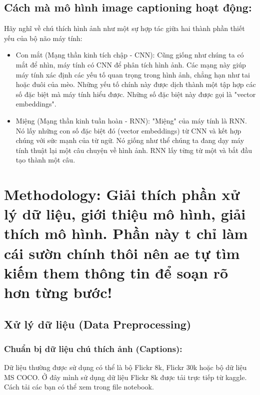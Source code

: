 \documentclass{article}
\begin{document}
\subsection{Cách mà mô hình image captioning hoạt động:}
Hãy nghĩ về chú thích hình ảnh như một sự hợp tác giữa hai thành phần thiết yếu của bộ não máy tính:
\renewcommand{\labelenumi}{\alph{enumi}.}
\begin{itemize}
    \item Con mắt (Mạng thần kinh tích chập - CNN): Cũng giống như chúng ta có mắt để nhìn, máy tính có CNN để phân tích hình ảnh. Các mạng này giúp máy tính xác định các yếu tố quan trọng trong hình ảnh, chẳng hạn như tai hoặc đuôi của mèo. Những yếu tố chính này được dịch thành một tập hợp các số đặc biệt mà máy tính hiểu được. Những số đặc biệt này được gọi là "vector embeddings".
    \item Miệng (Mạng thần kinh tuần hoàn - RNN): "Miệng" của máy tính là RNN. Nó lấy những con số đặc biệt đó (vector embeddings) từ CNN và kết hợp chúng với sức mạnh của từ ngữ. Nó giống như thể chúng ta đang dạy máy tính thuật lại một câu chuyện về hình ảnh. RNN lấy từng từ một và bắt đầu tạo thành một câu. 
\end{itemize}
\section{Methodology: Giải thích phần xử lý dữ liệu, giới thiệu mô hình, giải thích mô hình.
Phần này t chỉ làm cái sườn chính thôi nên ae tự tìm kiếm them thông tin để soạn rõ hơn từng bước!
}
\subsection{Xử lý dữ liệu (Data Preprocessing)}
\subsubsection{Chuẩn bị dữ liệu chú thích ảnh (Captions):}
Dữ liệu thường được sử dụng có thể là bộ Flickr 8k, Flickr 30k hoặc bộ dữ liệu MS COCO. Ở đây mình sử dụng dữ liệu Flickr 8k được tải trực tiếp từ kaggle. Cách tải các bạn có thể xem trong file notebook.
\end{document}
